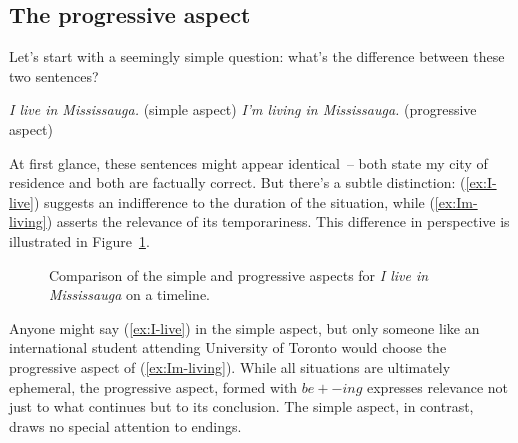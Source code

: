 \subsection{The progressive aspect}\label{sec:progressive-aspect}
Let's start with a seemingly simple question: what's the difference between these two sentences?

\ea
\ea \textit{I live in Mississauga.} \hfill(simple aspect) \label{ex:I-live}
\ex \textit{I'm living in Mississauga.} \hfill(progressive aspect) \label{ex:Im-living}
\z\z

At first glance, these sentences might appear identical~-- both state my city of residence and both are factually correct. But there's a subtle distinction: (\ref{ex:I-live}) suggests an indifference to the duration of the situation, while (\ref{ex:Im-living}) asserts the relevance of its temporariness. This difference in perspective is illustrated in Figure~\ref{fig:enter-label}.

\begin{figure}[ht]
    \centering
    \caption{Comparison of the simple and progressive aspects for \textit{I live in Mississauga} on a timeline.}
    \label{fig:enter-label}
\end{figure}

Anyone might say (\ref{ex:I-live}) in the simple aspect, but only someone like an international student attending University of Toronto would choose the progressive aspect of (\ref{ex:Im-living}). While all situations are ultimately ephemeral, the progressive aspect, formed with $be+-ing$ expresses relevance not just to what continues but to its conclusion. The simple aspect, in contrast, draws no special attention to endings.


